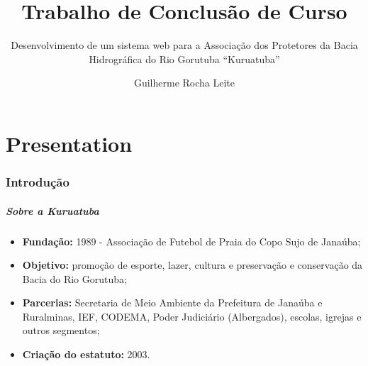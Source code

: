 \documentclass{beamer}
\title[Trabalho de Conclusão de Curso]{Trabalho de Conclusão de Curso}
\subtitle{Desenvolvimento de um sistema web para a Associação dos Protetores da Bacia Hidrográfica do Rio Gorutuba ``Kuruatuba''}
\author[Guilherme Rocha Leite]{Guilherme Rocha Leite}
\institute[UFVJM]{Universidade Federal dos Vales do Jequitinhonha e Mucuri \newline
  Bacharelado em Sistemas de Informação \newline
	  
     Orientador: Prof. Erinaldo Barbosa da Silva\\
     Coorientador: Thales Francisco Mota Carvalho\\
     $~$\\
}
\begin{document}
\frame{\titlepage}

\part{Presentation}




\section{Introdução}

\begin{frame}
    \frametitle{Sobre a Kuruatuba}
    \begin{itemize}
        \item \textbf{Fundação:} 1989 - Associação de Futebol de Praia do Copo Sujo de Janaúba;
        \item \textbf{Objetivo:} promoção de esporte, lazer, cultura e preservação e conservação da Bacia do Rio Gorutuba;
        \item \textbf{Parcerias:} Secretaria de Meio Ambiente da Prefeitura de Janaúba e Ruralminas, IEF, CODEMA, Poder Judiciário (Albergados), escolas, igrejas e outros segmentos;
        \item \textbf{Criação do estatuto:} 2003.
    \end{itemize}

\end{frame}
\end{document}
